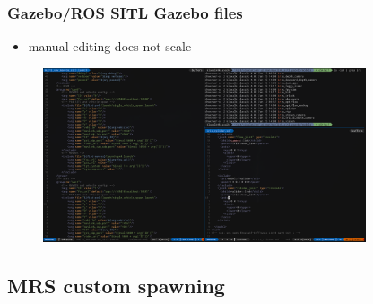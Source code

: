 \documentclass[aspectratio=169]{beamer}
\begin{document}
\begin{frame}
  \frametitle{Gazebo/ROS SITL Gazebo files}

  \begin{itemize}
    \item manual editing does not scale
  \end{itemize}

  \begin{figure}
    \centering
    \includegraphics[width=0.85\textwidth]{./fig/sitl_gazebo_files.png}
  \end{figure}

\end{frame}



\subsection{MRS custom spawning}
\end{document}
